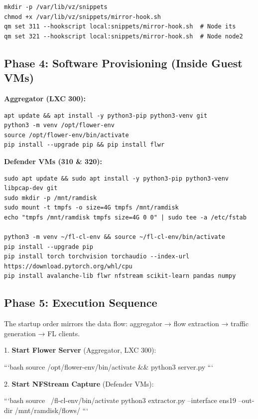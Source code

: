 \documentclass[conference]{IEEEtran}
\begin{document}
\begin{verbatim}
mkdir -p /var/lib/vz/snippets
chmod +x /var/lib/vz/snippets/mirror-hook.sh
qm set 311 --hookscript local:snippets/mirror-hook.sh  # Node its
qm set 321 --hookscript local:snippets/mirror-hook.sh  # Node node2
\end{verbatim}


\subsection{Phase 4: Software Provisioning (Inside Guest VMs)}

\textbf{Aggregator (LXC 300):}

\begin{verbatim}
apt update && apt install -y python3-pip python3-venv git
python3 -m venv /opt/flower-env
source /opt/flower-env/bin/activate
pip install --upgrade pip && pip install flwr
\end{verbatim}

\textbf{Defender VMs (310 \& 320):}

\begin{verbatim}
sudo apt update && sudo apt install -y python3-pip python3-venv libpcap-dev git
sudo mkdir -p /mnt/ramdisk
sudo mount -t tmpfs -o size=4G tmpfs /mnt/ramdisk
echo "tmpfs /mnt/ramdisk tmpfs size=4G 0 0" | sudo tee -a /etc/fstab

python3 -m venv ~/fl-cl-env && source ~/fl-cl-env/bin/activate
pip install --upgrade pip
pip install torch torchvision torchaudio --index-url https://download.pytorch.org/whl/cpu
pip install avalanche-lib flwr nfstream scikit-learn pandas numpy
\end{verbatim}


\subsection{Phase 5: Execution Sequence}

The startup order mirrors the data flow: aggregator → flow extraction → traffic generation → FL clients.

1. \textbf{Start Flower Server} (Aggregator, LXC 300):

    ```bash
    source /opt/flower-env/bin/activate \&\& python3 server.py
    ```

2. \textbf{Start NFStream Capture} (Defender VMs):

    ```bash
    source ~/fl-cl-env/bin/activate
    python3 extractor.py --interface ens19 --out-dir /mnt/ramdisk/flows/
    ```
\end{document}
